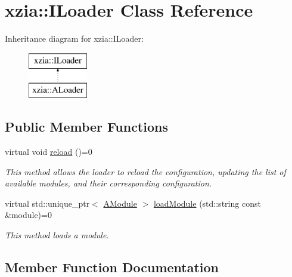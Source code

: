 \hypertarget{classxzia_1_1ILoader}{}\section{xzia\+:\+:I\+Loader Class Reference}
\label{classxzia_1_1ILoader}
Inheritance diagram for xzia\+:\+:I\+Loader\+:\begin{figure}[H]
\begin{center}
\leavevmode
\includegraphics[height=2.000000cm]{classxzia_1_1ILoader}
\end{center}
\end{figure}
\subsection*{Public Member Functions}
\begin{DoxyCompactItemize}
\item 
\mbox{\label{classxzia_1_1ILoader_a8662be66536e6414c223d7f4d861e7d9}} 
virtual void \mbox{\hyperlink{classxzia_1_1ILoader_a8662be66536e6414c223d7f4d861e7d9}{reload}} ()=0
\begin{DoxyCompactList}\small\item\em This method allows the loader to reload the configuration, updating the list of available modules, and their corresponding configuration. \end{DoxyCompactList}\item 
virtual std\+::unique\+\_\+ptr$<$ \mbox{\hyperlink{classxzia_1_1AModule}{A\+Module}} $>$ \mbox{\hyperlink{classxzia_1_1ILoader_a6aad71496e1ebfa29aebe1c351a1e871}{load\+Module}} (std\+::string const \&module)=0
\begin{DoxyCompactList}\small\item\em This method loads a module. \end{DoxyCompactList}\end{DoxyCompactItemize}


\subsection{Member Function Documentation}
\mbox{\label{classxzia_1_1ILoader_a6aad71496e1ebfa29aebe1c351a1e871}} 

